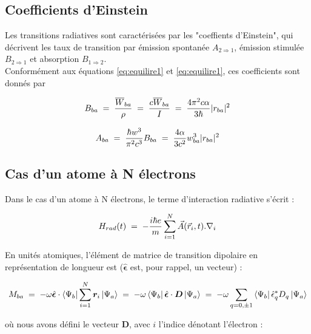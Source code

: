     \subsection{Coefficients d'Einstein}



Les transitions radiatives sont caractérisées par les "coeffients d'Einstein", qui décrivent les taux de transition par émission spontanée $A_{2\Rightarrow1}$, émission stimulée $B_{2\Rightarrow 1}$ et absorption $B_{1\Rightarrow2}$.\\
Conformément aux équations \eqref{eq:equilire1} et \eqref{eq:equilire1}, ces coefficients sont donnés par 

\begin{equation}
    B_{ba}\; = \; \dfrac{\overline{W}_{ba}}{\rho}\; = \; \dfrac{c\overline{W}_{ba}}{I}\; = \; \dfrac{4\pi^2 c \alpha}{3 \hbar}|r_{ba}|^2
\end{equation}

\begin{equation}
    A_{ba}\; = \; \dfrac{\hbar w^3}{\pi^2 c^3}B_{ba}\; = \; \dfrac{4 \alpha}{3 c^2}w_{ba}^3|r_{ba}|^2
\end{equation}



    \subsection{Cas d'un atome à N électrons}



Dans le cas d'un atome à N électrons, le terme d'interaction radiative s'écrit : 

\begin{equation}
    H_{rad}(t)\; = \; -\dfrac{i\hbar e}{m}\sum_{i=1}^{N} \vec{A}(\vec{r}_i,t).\nabla_i
\end{equation}

En unités atomiques, l'élément de matrice de transition dipolaire en représentation de longueur est ($\hat{\bm{\epsilon}}$ est, pour rappel, un vecteur) :

\begin{equation}
    M_{ba} \; = \; 
    -\omega \hat{\bm{\epsilon}}\cdot\bra{\Psi_b}\sum_{i=1}^{N} \bm{r}_i\ket{\Psi_a}
    \; = \; 
    -\omega \bra{\Psi_b}\hat{\bm{\epsilon}} \cdot \bm{D}\ket{\Psi_a}
    \; = \;
    -\omega \sum_{q=0,\pm 1}\bra{\Psi_b}\hat{\epsilon}_q^* D_q\ket{\Psi_a}
\end{equation}

où nous avons défini le vecteur $\bm{D}$, avec $i$ l'indice dénotant l'électron :

